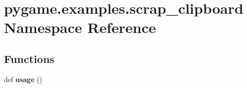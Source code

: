 \hypertarget{namespacepygame_1_1examples_1_1scrap__clipboard}{}\section{pygame.\+examples.\+scrap\+\_\+clipboard Namespace Reference}
\label{namespacepygame_1_1examples_1_1scrap__clipboard}
\subsection*{Functions}
\begin{DoxyCompactItemize}
\item 
\mbox{\label{namespacepygame_1_1examples_1_1scrap__clipboard_a509abaf8dc871eb3ee1a73b687a7446e}} 
def {\bfseries usage} ()
\end{DoxyCompactItemize}
